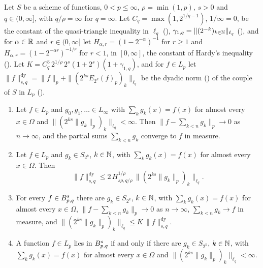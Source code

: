 \begin{theorem}
\label{thm:besov-blocks}
\leanok
{}
Let $S$ be a scheme of functions, $0 < p \leq \infty$, $\rho = \min(1, p)$, $s > 0$ and
$q \in (0, \infty]$, with $q/\rho = \infty$ for $q = \infty$. Let $C_q = \max(1, 2^{1/q - 1})$,
$1/\infty = 0$, be the constant of the quasi-triangle inequality in $\ell_q$
(), $\gamma_{1,q} = \|(2^{-k})_{k \in \mathbb{N}}\|_{\ell_q}$
(), and for $\alpha \in \mathbb{R}$ and $r \in (0, \infty]$ let
$H_{\alpha, r} = (1 - 2^{-\alpha})^{-1}$ for $r \geq 1$ and
$H_{\alpha, r} = (1 - 2^{-\alpha r})^{-1/r}$ for $r < 1$, in $[0, \infty]$, the constant of
Hardy's inequality (). Let
$K = C_q^3 \, 2^{1/\rho} \, 2^s (1 + 2^s) (1 + \gamma_{1,q})$, and for $f \in L_p$ let
$\|f\|^{\mathrm{dy}}_{s,q} = \|f\|_p + \|(2^{ks} E_{2^k}(f)_p)_k\|_{\ell_q}$ be the dyadic norm
() of the couple of $S$ in $L_p$ ().
\begin{enumerate}
  \item Let $f \in L_p$ and $g_0, g_1, \dots \in L_\infty$ with
    $\sum_k g_k(x) = f(x)$ for almost every $x \in \Omega$ and
    $\|(2^{ks} \|g_k\|_p)_k\|_{\ell_q} < \infty$. Then $\bigl\|f - \sum_{k<n} g_k\bigr\|_p \to 0$
    as $n \to \infty$, and the partial sums $\sum_{k<n} g_k$ converge to $f$ in measure.
  \item Let $f \in L_p$ and $g_k \in S_{2^k}$, $k \in \mathbb{N}$, with
    $\sum_k g_k(x) = f(x)$ for almost every $x \in \Omega$. Then
    \[
      \|f\|^{\mathrm{dy}}_{s,q} \leq 2 \, H_{s\rho, q/\rho}^{1/\rho} \,
      \|(2^{ks} \|g_k\|_p)_k\|_{\ell_q} .
    \]
  \item For every $f \in B^{s}_{p,q}$ there are $g_k \in S_{2^k}$, $k \in \mathbb{N}$, with
    $\sum_k g_k(x) = f(x)$ for almost every $x \in \Omega$,
    $\bigl\|f - \sum_{k<n} g_k\bigr\|_p \to 0$ as $n \to \infty$, $\sum_{k<n} g_k \to f$ in
    measure, and $\|(2^{ks} \|g_k\|_p)_k\|_{\ell_q} \leq K \, \|f\|^{\mathrm{dy}}_{s,q}$.
  \item A function $f \in L_p$ lies in $B^{s}_{p,q}$ if and only if there are
    $g_k \in S_{2^k}$, $k \in \mathbb{N}$, with $\sum_k g_k(x) = f(x)$ for almost every
    $x \in \Omega$ and $\|(2^{ks} \|g_k\|_p)_k\|_{\ell_q} < \infty$.
\end{enumerate}
\end{theorem}

